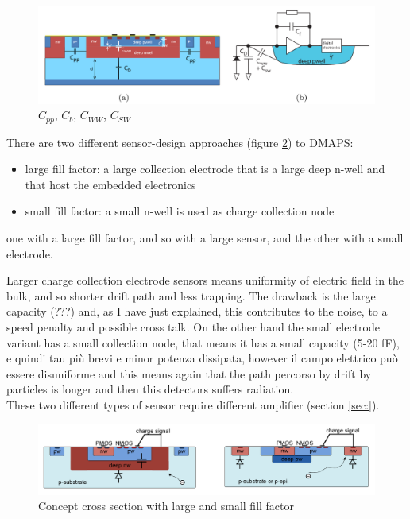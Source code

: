 \begin{titlepage}
\begin{figure}
\centering\includegraphics[width=12cm]{figures/DMAPS_capacity.png}
\caption{$C_{pp}$, $C_{b}$, $C_{WW}$, $C_{SW}$}
\label{fig:DMAPS_capacity}
\end{figure}

There are two different sensor-design approaches (figure \ref{fig:large_small_sensor_scheme})
to DMAPS:
\begin{itemize}
\item large fill factor: a large collection electrode that is a large deep n-well
 and that host the embedded electronics
\item small fill factor: a small n-well is used as charge collection node
\end{itemize}

one with a large fill factor, and so with a large sensor, and the other
with a small electrode.

Larger charge collection electrode sensors means uniformity of electric field in
the bulk, and so shorter drift path and less trapping. The drawback is the large
capacity (???) and, as I have just explained, this contributes to the noise, to a
speed penalty and possible cross talk.
On the other hand the small electrode variant has a small collection node, that means
it has a small capacity (5-20 fF), e quindi tau più brevi e minor potenza dissipata,
however il campo elettrico può essere disuniforme and this means again
that the path percorso by drift by particles is longer and then this
detectors suffers radiation. \\
These two different types of sensor require different amplifier (section \ref{sec:}).

\begin{figure}
\centering\includegraphics[width=12cm]{figures/large_small_sensor_scheme.png}
\caption{Concept cross section with large and small fill factor}
\label{fig:large_small_sensor_scheme}
\end{figure}


\end{titlepage}
